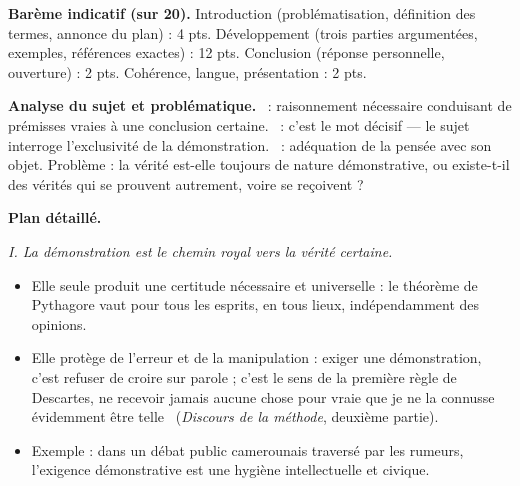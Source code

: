 \documentclass[11pt]{article}
\newcommand{\cle}[1]{{\popxbold\color{popdark}#1}}
\begin{document}
\begin{corrige}
\textbf{Barème indicatif (sur 20).} Introduction (problématisation, définition des termes, annonce du plan) : 4 pts. Développement (trois parties argumentées, exemples, références exactes) : 12 pts. Conclusion (réponse personnelle, ouverture) : 2 pts. Cohérence, langue, présentation : 2 pts.

\textbf{Analyse du sujet et problématique.} \guillemotleft \cle{Démonstration} \guillemotright\ : raisonnement nécessaire conduisant de prémisses vraies à une conclusion certaine. \guillemotleft \cle{Seul} \guillemotright\ : c'est le mot décisif — le sujet interroge l'exclusivité de la démonstration. \guillemotleft \cle{Vérité} \guillemotright\ : adéquation de la pensée avec son objet. \cle{Problème} : la vérité est-elle toujours de nature démonstrative, ou existe-t-il des vérités qui se prouvent autrement, voire se reçoivent ?

\textbf{Plan détaillé.}

\emph{I. La démonstration est le chemin royal vers la vérité \cle{certaine}.}
\begin{itemize}
\item Elle seule produit une certitude \cle{nécessaire} et \cle{universelle} : le théorème de Pythagore vaut pour tous les esprits, en tous lieux, indépendamment des opinions.
\item Elle protège de l'erreur et de la \cle{manipulation} : exiger une démonstration, c'est refuser de croire sur parole ; c'est le sens de la première règle de Descartes, \guillemotleft ne recevoir jamais aucune chose pour vraie que je ne la connusse évidemment être telle \guillemotright\ (\emph{Discours de la méthode}, deuxième partie).
\item Exemple : dans un débat public camerounais traversé par les rumeurs, l'exigence démonstrative est une \cle{hygiène intellectuelle et civique}.
\end{itemize}


\end{corrige}
\end{document}
